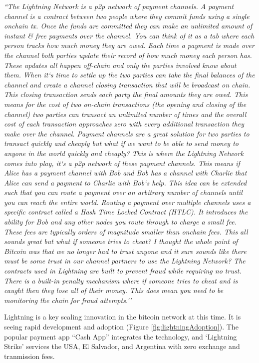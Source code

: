 \textit{``The Lightning Network is a p2p network of payment channels. A payment channel is a contract between two people where they commit funds using a single onchain tx.  Once the funds are committed they can make an unlimited amount of instant \& free payments over the channel.
You can think of it as a tab where each person tracks how much money they are owed.  Each time a payment is made over the channel both parties update their record of how much money each person has.  These updates all happen off-chain and only the parties involved know about them. When it`s time to settle up the two parties can take the final balances of the channel and create a channel closing transaction that will be broadcast on chain.  This closing transaction sends each party the final amounts they are owed. This means for the cost of two on-chain transactions (the opening and closing of the channel) two parties can transact an unlimited number of times and the overall cost of each transaction approaches zero with every additional transaction they make over the channel. Payment channels are a great solution for two parties to transact quickly and cheaply but what if we want to be able to send money to anyone in the world quickly and cheaply?  This is where the Lightning Network comes into play, it`s a p2p network of these payment channels. This means if Alice has a payment channel with Bob and Bob has a channel with Charlie that Alice can send a payment to Charlie with Bob`s help. This idea can be extended such that you can route a payment over an arbitrary number of channels until you can reach the entire world. Routing a payment over multiple channels uses a specific contract called a Hash Time Locked Contract (HTLC).  It introduces the ability for Bob and any other nodes you route through to charge a small fee.  These fees are typically orders of magnitude smaller than onchain fees. This all sounds great but what if someone tries to cheat? I thought the whole point of Bitcoin was that we no longer had to trust anyone and it sure sounds like there must be some trust in our channel partners to use the Lightning Network? The contracts used in Lightning are built to prevent fraud while requiring no trust.  There is a built-in penalty mechanism where if someone tries to cheat and is caught then they lose all of their money.  This does mean you need to be monitoring the chain for fraud attempts.''}

Lightning is a key scaling innovation in the bitcoin network at this time. It is seeing rapid development and adoption (Figure \ref{fig:lightningAdoption}). The popular payment app ``Cash App'' integrates the technology, and `Lightning Strike' services the USA, El Salvador, and Argentina with zero exchange and tranmission fees.

